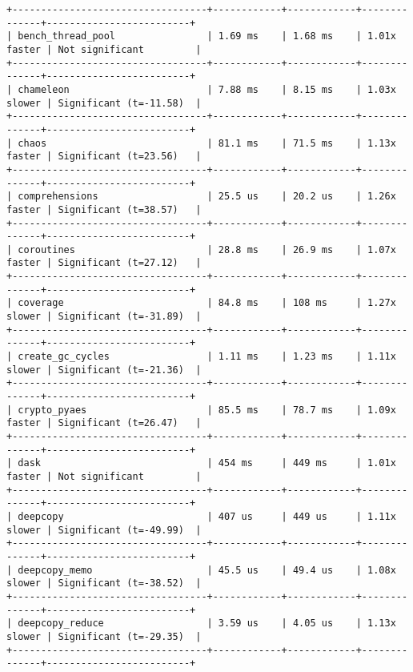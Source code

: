\begin{code}
\begin{verbatim}
+----------------------------------+------------+------------+--------------+-------------------------+
| bench_thread_pool                | 1.69 ms    | 1.68 ms    | 1.01x faster | Not significant         |
+----------------------------------+------------+------------+--------------+-------------------------+
| chameleon                        | 7.88 ms    | 8.15 ms    | 1.03x slower | Significant (t=-11.58)  |
+----------------------------------+------------+------------+--------------+-------------------------+
| chaos                            | 81.1 ms    | 71.5 ms    | 1.13x faster | Significant (t=23.56)   |
+----------------------------------+------------+------------+--------------+-------------------------+
| comprehensions                   | 25.5 us    | 20.2 us    | 1.26x faster | Significant (t=38.57)   |
+----------------------------------+------------+------------+--------------+-------------------------+
| coroutines                       | 28.8 ms    | 26.9 ms    | 1.07x faster | Significant (t=27.12)   |
+----------------------------------+------------+------------+--------------+-------------------------+
| coverage                         | 84.8 ms    | 108 ms     | 1.27x slower | Significant (t=-31.89)  |
+----------------------------------+------------+------------+--------------+-------------------------+
| create_gc_cycles                 | 1.11 ms    | 1.23 ms    | 1.11x slower | Significant (t=-21.36)  |
+----------------------------------+------------+------------+--------------+-------------------------+
| crypto_pyaes                     | 85.5 ms    | 78.7 ms    | 1.09x faster | Significant (t=26.47)   |
+----------------------------------+------------+------------+--------------+-------------------------+
| dask                             | 454 ms     | 449 ms     | 1.01x faster | Not significant         |
+----------------------------------+------------+------------+--------------+-------------------------+
| deepcopy                         | 407 us     | 449 us     | 1.11x slower | Significant (t=-49.99)  |
+----------------------------------+------------+------------+--------------+-------------------------+
| deepcopy_memo                    | 45.5 us    | 49.4 us    | 1.08x slower | Significant (t=-38.52)  |
+----------------------------------+------------+------------+--------------+-------------------------+
| deepcopy_reduce                  | 3.59 us    | 4.05 us    | 1.13x slower | Significant (t=-29.35)  |
+----------------------------------+------------+------------+--------------+-------------------------+

\end{verbatim}
\end{code}
